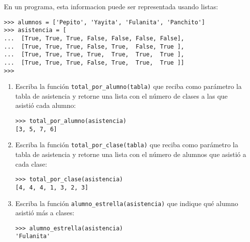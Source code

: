 En un programa, esta informacion puede ser representada usando listas:

\begin{lstlisting}
>>> alumnos = ['Pepito', 'Yayita', 'Fulanita', 'Panchito']
>>> asistencia = [
...  [True, True, True, False, False, False, False],
...  [True, True, True, False, True,  False, True ],
...  [True, True, True, True,  True,  True,  True ],
...  [True, True, True, False, True,  True,  True ]]
>>>
\end{lstlisting}

\begin{enumerate}
\item
  Escriba la función \lstinline!total_por_alumno(tabla)! que reciba como
  parámetro la tabla de asistencia y retorne una lista con el número de
  clases a las que asistió cada alumno:

\begin{lstlisting}
>>> total_por_alumno(asistencia)
[3, 5, 7, 6]
\end{lstlisting}
\item
  Escriba la función \lstinline!total_por_clase(tabla)! que reciba como
  parámetro la tabla de asistencia y retorne una lista con el número de
  alumnos que asistió a cada clase:

\begin{lstlisting}
>>> total_por_clase(asistencia)
[4, 4, 4, 1, 3, 2, 3]
\end{lstlisting}
\item
  Escriba la función \lstinline!alumno_estrella(asistencia)! que indique
  qué alumno asistió más a clases:

\begin{lstlisting}
>>> alumno_estrella(asistencia)
'Fulanita'
\end{lstlisting}
\end{enumerate}
